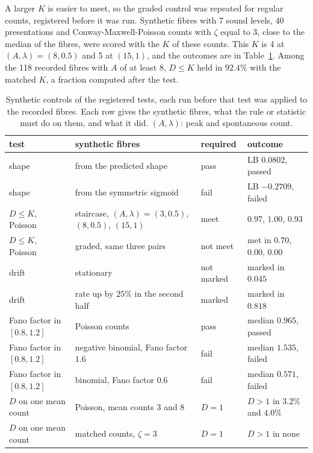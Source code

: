 \documentclass[10pt,letterpaper]{article}
\begin{document}
A larger $K$ is easier to meet, so the graded control was repeated for regular counts, registered before it was run. Synthetic fibres
with 7 sound levels, 40 presentations and Conway-Maxwell-Poisson counts with $\zeta$ equal to 3, close to the median of the fibres,
were scored with the $K$ of these counts. This $K$ is 4 at $(A,\lambda)=(8,0.5)$ and 5 at $(15,1)$, and the outcomes are in Table~\ref{tab:controls}. Among the 118 recorded fibres
with $A$ of at least 8, $D\le K$ held in $92.4\%$ with the matched $K$, a fraction computed after the test.


\begin{table}[tp]
\caption{Synthetic controls of the registered tests, each run before that test was applied to the recorded fibres. Each row gives the synthetic
fibres, what the rule or statistic must do on them, and what it did. $(A,\lambda)$: peak and spontaneous count.}\label{tab:controls}
\centering
\small
\begin{tabular}{>{\raggedright\arraybackslash}p{3.0cm}>{\raggedright\arraybackslash}p{5.0cm}>{\raggedright\arraybackslash}p{2.2cm}>{\raggedright\arraybackslash}p{3.6cm}}
\hline
test & synthetic fibres & required & outcome\\
\hline
shape & 200 from the predicted shape & pass & LB $0.0802$, passed\\
shape & 200 from the symmetric sigmoid & fail & LB $-0.2709$, failed\\
$D\le K$, Poisson & staircase, $(A,\lambda)=(3,0.5)$, $(8,0.5)$, $(15,1)$ & meet & $0.97$, $1.00$, $0.93$\\
$D\le K$, Poisson & graded, same three pairs & not meet & met in $0.70$, $0.00$, $0.00$\\
drift & stationary & not marked & marked in $0.045$\\
drift & rate up by $25\%$ in the second half & marked & marked in $0.818$\\
Fano factor in $[0.8,1.2]$ & Poisson counts & pass & median $0.965$, passed\\
Fano factor in $[0.8,1.2]$ & negative binomial, Fano factor $1.6$ & fail & median $1.535$, failed\\
Fano factor in $[0.8,1.2]$ & binomial, Fano factor $0.6$ & fail & median $0.571$, failed\\
$D$ on one mean count & Poisson, mean counts 3 and 8 & $D=1$ & $D>1$ in $3.2\%$ and $4.0\%$\\
$D$ on one mean count & matched counts, $\zeta=3$ & $D=1$ & $D>1$ in none\\

\end{tabular}
\end{table}
\end{document}
